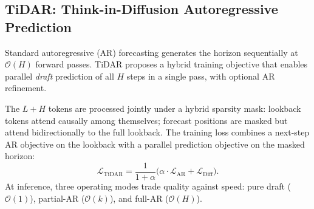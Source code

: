 \subsection{TiDAR: Think-in-Diffusion Autoregressive Prediction}

Standard autoregressive (AR) forecasting generates the horizon sequentially at $\mathcal{O}(H)$ forward passes.
TiDAR \cite{tidar2024} proposes a hybrid training objective that enables parallel \emph{draft} prediction of all $H$ steps in a single pass, with optional AR refinement.

The $L+H$ tokens are processed jointly under a hybrid sparsity mask: lookback tokens attend causally among themselves; forecast positions are masked but attend bidirectionally to the full lookback.
The training loss combines a next-step AR objective on the lookback with a parallel prediction objective on the masked horizon:
\begin{equation}
  \mathcal{L}_{\mathrm{TiDAR}} = \frac{1}{1+\alpha}\bigl(\alpha \cdot \mathcal{L}_{\mathrm{AR}} + \mathcal{L}_{\mathrm{Diff}}\bigr).
  \label{eq:tidar_loss}
\end{equation}
At inference, three operating modes trade quality against speed: pure draft ($\mathcal{O}(1)$), partial-AR ($\mathcal{O}(k)$), and full-AR ($\mathcal{O}(H)$).
